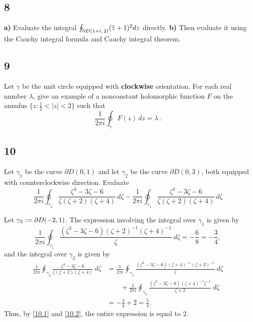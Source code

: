 \documentclass[12pt]{article}
\begin{document}
\subsection*{8}
\begin{tcolorbox}
{\bf a)} Evaluate the integral $\oint_{\partial
D(1+i,\,2)}(\overline z+1)^{2}dz$ directly. {\bf b)}
Then evaluate it using the Cauchy integral formula and Cauchy integral theorem.
\end{tcolorbox}

\subsection*{9}
\begin{tcolorbox}Let $\gamma$ be the unit circle equipped with {\bf clockwise}
orientation. For each real number $\lambda$, give an example of a
nonconstant holomorphic function $F$ on the annulus
$\{z:\frac12<|z|<2\}$ such that $$\dfrac{1}{2\pi
i}\oint_{\gamma}F(z)\,dz=\lambda\,.$$
\end{tcolorbox}



\subsection*{10}
\begin{tcolorbox}
Let $\gamma_1$ be the curve $\partial D(0,1)$ and let $\gamma_2$ be the curve $\partial
D(0,3)$, both equipped with counterclockwise direction. Evaluate
$$\dfrac{1}{2\pi
i}\oint_{\gamma_2}
\dfrac{\zeta^3-3\zeta-6}{\zeta(\zeta+2)(\zeta+4)}\,d\zeta-\dfrac{1}{2\pi
i}\oint_{\gamma_1}
\dfrac{\zeta^3-3\zeta-6}{\zeta(\zeta+2)(\zeta+4)}\,d\zeta$$
\end{tcolorbox}
Let $\gamma_3 := \partial D(-2,1)$. The expression involving the integral over $\gamma_{1}$ is given by 
\begin{equation}
\frac{1}{2\pi i}\oint_{\gamma_1}\frac{(\zeta^3 - 3\zeta - 6)(\zeta+2)^{-1}(\zeta+4)^{-1}}{\zeta}\ d\zeta = -\frac{6}{8} = -\frac{3}{4}, 
\label{10.1}
\end{equation}
and the integral over $\gamma_{2}$ is given by
\begin{align}
\frac{1}{2\pi i}\oint_{\gamma_2} \frac{\zeta^3 - 3\zeta - 6}{\zeta(\zeta + 2)(\zeta + 4)}\ d\zeta & = \frac{1}{2\pi i}\oint_{\gamma_1}\frac{(\zeta^3 -
3\zeta - 6)(\zeta + 4)^{-1}(\zeta+2)^{-1}}{\zeta}\ d\zeta \nonumber \\ 
& \qquad + \frac{1}{2\pi i}\oint_{\gamma_3}\frac{(\zeta^{3} - 3\zeta - 6)(\zeta+4)^{-1}\zeta^{-1}}{\zeta + 2}\ d\zeta \nonumber \\
& = -\frac{3}{4} + 2 = \frac{5}{4}. \label{10.2}
\end{align}
Thus, by \eqref{10.1} and \eqref{10.2}, the entire expression is equal to 2.
\end{document}

